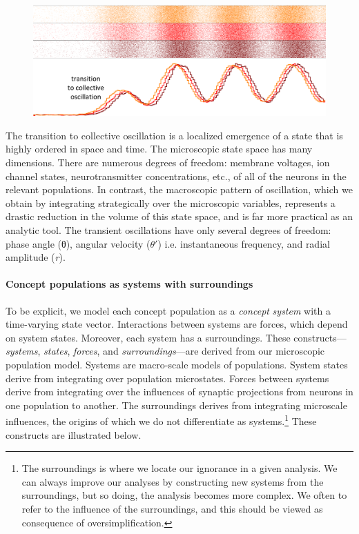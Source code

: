   
\begin{figure}
\includegraphics[width=\textwidth]{figures/Tilsen-img10.png}
\caption{\missingcaption}
\label{fig:}
\end{figure}
 

  The transition to collective oscillation is a localized emergence of a state that is highly ordered in space and time. The microscopic state space has many dimensions. There are numerous degrees of freedom: membrane voltages, ion channel states, neurotransmitter concentrations, etc., of all of the neurons in the relevant populations. In contrast, the macroscopic pattern of oscillation, which we obtain by integrating strategically over the microscopic variables, represents a drastic reduction in the volume of this state space, and is far more practical as an analytic tool. The transient oscillations have only several degrees of freedom: phase angle (θ), angular velocity ($\theta ′$) i.e. instantaneous frequency, and radial amplitude (\textit{r}).

\paragraph{{\textbf{Concept populations as systems with surroundings}}} 

To be explicit, we model each concept population as a \textit{concept} \textit{system} with a time-varying state vector. Interactions between systems are forces, which depend on system states. Moreover, each system has a surroundings. These constructs—\textit{systems}, \textit{states}, \textit{forces}, and \textit{surroundings}—are derived from our microscopic population model. Systems are macro-scale models of populations. System states derive from integrating over population microstates. Forces between systems derive from integrating over the influences of synaptic projections from neurons in one population to another. The surroundings derives from integrating microscale influences, the origins of which we do not differentiate as systems.\footnote{The surroundings is where we locate our ignorance in a given analysis. We can always improve our analyses by constructing new systems from the surroundings, but so doing, the analysis becomes more complex. We often to refer to the influence of the surroundings, and this should be viewed as consequence of oversimplification.} These constructs are illustrated below.

